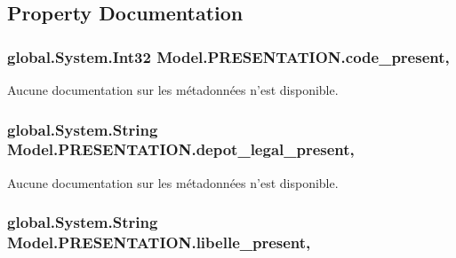 \subsection{Property Documentation}
\hypertarget{class_model_1_1_p_r_e_s_e_n_t_a_t_i_o_n_a97c7cbefa08736b44382aec5dda9adf4}{
\subsubsection[{code\-\_\-present}]{\setlength{\rightskip}{0pt plus 5cm}global.\-System.\-Int32 Model.\-P\-R\-E\-S\-E\-N\-T\-A\-T\-I\-O\-N.\-code\-\_\-present\hspace{0.3cm}{\ttfamily [get]}, {\ttfamily [set]}}}\label{class_model_1_1_p_r_e_s_e_n_t_a_t_i_o_n_a97c7cbefa08736b44382aec5dda9adf4}


Aucune documentation sur les métadonnées n'est disponible. 

\hypertarget{class_model_1_1_p_r_e_s_e_n_t_a_t_i_o_n_a9e2fa4b05a5ce426e1c1cc8ec44b25bc}{
\subsubsection[{depot\-\_\-legal\-\_\-present}]{\setlength{\rightskip}{0pt plus 5cm}global.\-System.\-String Model.\-P\-R\-E\-S\-E\-N\-T\-A\-T\-I\-O\-N.\-depot\-\_\-legal\-\_\-present\hspace{0.3cm}{\ttfamily [get]}, {\ttfamily [set]}}}\label{class_model_1_1_p_r_e_s_e_n_t_a_t_i_o_n_a9e2fa4b05a5ce426e1c1cc8ec44b25bc}


Aucune documentation sur les métadonnées n'est disponible. 

\hypertarget{class_model_1_1_p_r_e_s_e_n_t_a_t_i_o_n_ae64c2be728fa1e6dbd1a5766e4453d07}{
\subsubsection[{libelle\-\_\-present}]{\setlength{\rightskip}{0pt plus 5cm}global.\-System.\-String Model.\-P\-R\-E\-S\-E\-N\-T\-A\-T\-I\-O\-N.\-libelle\-\_\-present\hspace{0.3cm}{\ttfamily [get]}, {\ttfamily [set]}}}\label{class_model_1_1_p_r_e_s_e_n_t_a_t_i_o_n_ae64c2be728fa1e6dbd1a5766e4453d07}


